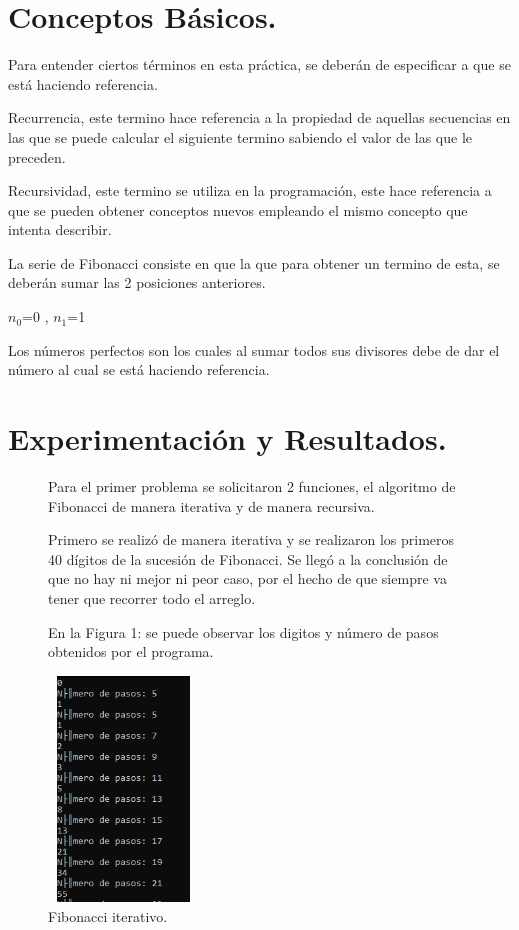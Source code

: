 \documentclass{report}
\begin{document}
	\section*{Conceptos Básicos.}
	\large Para entender ciertos términos en esta práctica, se deberán de especificar a que se está haciendo referencia.\par
	\large Recurrencia, este termino hace referencia a la propiedad de aquellas secuencias en las que se puede calcular el siguiente termino sabiendo el valor de las que le preceden.\par
	\large Recursividad, este termino se utiliza en la programación, este hace referencia a que se pueden obtener conceptos nuevos empleando el mismo concepto que intenta describir.\par
	\large La serie de Fibonacci consiste en que la que para obtener un termino de esta, se deberán sumar las 2 posiciones anteriores.\par
	\begin{center}
		\large $n_0$=0 , $n_1$=1\par
	\end{center}
	\large Los números perfectos son los cuales al sumar todos sus divisores debe de dar el número al cual se está haciendo referencia.\par
	\newpage
	
	\section*{Experimentación y Resultados.}
	\begin{figure}[h]
		\large Para el primer problema se solicitaron 2 funciones, el algoritmo de Fibonacci de manera iterativa y de manera recursiva.\par
		\large Primero se realizó de manera iterativa y se realizaron los primeros 40 dígitos de la sucesión de Fibonacci. Se llegó a la conclusión de que no hay ni mejor ni peor caso, por el hecho de que siempre va tener que recorrer todo el arreglo.\par
		\large En la Figura 1: se puede observar los digitos y número de pasos obtenidos por el programa.\par
		\centering
			\includegraphics[width=4cm, height=6cm]{1} \par
		\caption{Fibonacci iterativo.}
	\end{figure}
	\newpage
\end{document}
